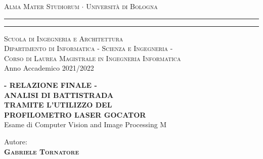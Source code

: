 \thispagestyle{empty}
\vspace*{-1.5cm} \bfseries{
\begin{center}
    {{\Large{\textsc{Alma Mater Studiorum $\cdot$ Università di
    Bologna}}}}
	\rule[0.1cm]{15.8cm}{0.1mm}
    \rule[0.5cm]{15.8cm}{0.6mm}
    {\normalsize{\textsc { Scuola di Ingegneria e Architettura\\
    \vspace{5mm}
    Dipartimento di Informatica - Scienza e Ingegneria -\\
    \vspace{5mm}
    Corso di Laurea Magistrale in Ingegneria Informatica}}}\\
	\vspace{10mm}
	{\small{\sc Anno Accademico 2021/2022}}%
\end{center}
\vspace{10mm}
\begin{center}
    {\LARGE\textbf{- RELAZIONE FINALE -}}\\
    \vspace{3mm}
    {\LARGE\textbf{ANALISI DI BATTISTRADA}}\\
    \vspace{3mm}
    {\LARGE\textbf{TRAMITE L'UTILIZZO DEL}}\\
    \vspace{3mm}
    {\LARGE{\bf PROFILOMETRO LASER GOCATOR}}\\
    \vspace{10mm} {\large{\sc Esame di Computer Vision and Image Processing M}}
\end{center}
\vfill
\par
\noindent
\begin{minipage}[t]{0.47\textwidth}
    {\large{\sc Autore:}\\
    {\bf \textsc{Gabriele Tornatore}}}\\
\end{minipage}
\vspace{20mm}
}